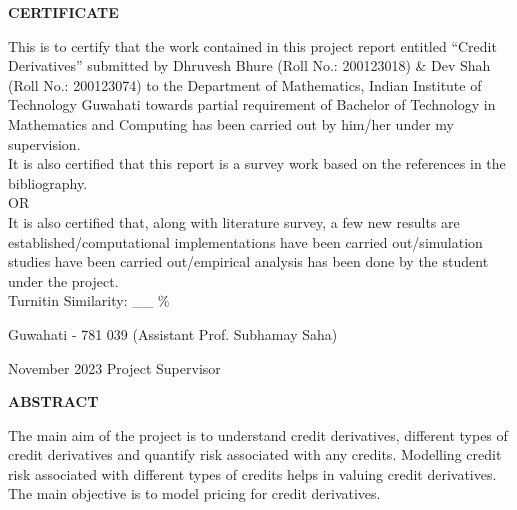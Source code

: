\documentclass[11pt,a4paper]{report}
\theoremstyle{plain}
\theoremstyle{definition}
\theoremstyle{remark}
\begin{document}
 \setcounter{page}{2}
\begin{center}
{\Large{\bf{CERTIFICATE}}}
\end{center}


\noindent
This is to certify that the work contained in this project report entitled 
“Credit Derivatives” submitted by Dhruvesh Bhure (Roll No.: 200123018) \& Dev Shah (Roll No.: 200123074)
to the Department of Mathematics, Indian Institute of Technology Guwahati towards partial requirement of
Bachelor of Technology in Mathematics and Computing has been carried out by him/her under
my supervision. \\

\noindent
It is also certified that this report is a survey work based on the references
in the bibliography.\\

OR\\

\noindent
It is also certified that, along with literature survey,
a few new results are established/computational implementations have been carried
out/simulation studies have been carried out/empirical analysis
has been done by the student under the project.\\

\noindent
Turnitin Similarity: \_\_ \%
%

\vspace{4cm}

\noindent Guwahati - 781 039 \hfill (Assistant Prof. Subhamay Saha)

\noindent November 2023 \hfill Project Supervisor

\clearpage

\begin{center}
{\Large{\bf{ABSTRACT}}}
\end{center}


The main aim of the project is to understand credit derivatives, different types of credit derivatives and quantify risk associated with any credits. Modelling credit risk associated with different types of credits helps in valuing credit derivatives. The main objective is to model pricing for credit derivatives.

\clearpage



\tableofcontents
\clearpage



\newpage

\setcounter{page}{1}










\end{document}
